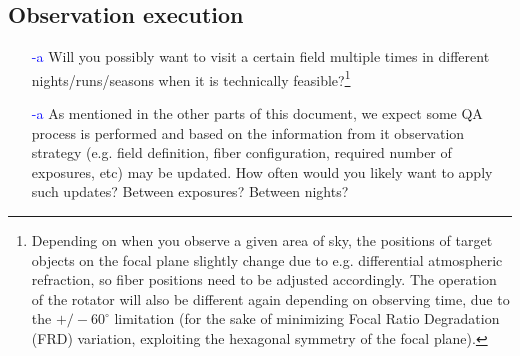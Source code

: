 \documentclass[a4paper,notitlepage]{article}
\newcommand{\colm}[1]{\textcolor{yellow}{\thesubsubsection-#1}}
\newcommand{\coll}[1]{\textcolor{blue}{\thesubsubsection-#1}}
\begin{document}
%
%

\subsection{Observation execution}

\begin{enumerate}
  \item[\coll{a}] Will you possibly want to visit a certain field
           multiple times in different nights/runs/seasons when it
           is technically feasible?\footnote{Depending on when you
           observe a given area of sky, the positions of target
           objects on the focal plane slightly change due to
           e.g. differential atmospheric refraction, so fiber
           positions need to be adjusted accordingly. The operation
           of the rotator will also be different again depending on
           observing time, due to the $+/-60^{\circ}$ limitation
           (for the sake of minimizing Focal Ratio Degradation (FRD)
           variation, exploiting the hexagonal symmetry of the focal
           plane).}
  \item[\coll{a}] As mentioned in the other parts of this document, we
           expect some QA process is performed and based on the
           information from it observation strategy (e.g. field
           definition, fiber configuration, required number of
           exposures, etc) may be updated. How often would you
           likely want to apply such updates? Between exposures?
           Between nights?
\end{enumerate}
\end{document}
